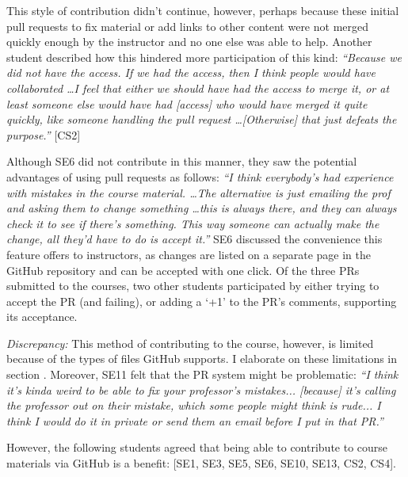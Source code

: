 This style of contribution didn't continue, however, perhaps because these initial pull requests to fix material or add links to other content were not merged quickly enough by the instructor and no one else was able to help. Another student described how this hindered more participation of this kind: \textit{``Because we did not have the access. If we had the access, then I think people would have collaborated \ldots I feel that either we should have had the access to merge it, or at least someone else would have had [access] who would have merged it quite quickly, like someone handling the pull request \ldots [Otherwise] that just defeats the purpose.''} [CS2]

Although SE6 did not contribute in this manner, they saw the potential advantages of using pull requests as follows: \textit{``I think everybody's had experience with mistakes in the course material. \ldots The alternative is just emailing the prof and asking them to change something \ldots this is always there, and they can always check it to see if there's something. This way someone can actually make the change, all they'd have to do is accept it.''} SE6 discussed the convenience this feature offers to instructors, as changes are listed on a separate page in the GitHub repository and can be accepted with one click. Of the three PRs submitted to the courses, two other students participated by either trying to accept the PR (and failing), or adding a `+1' to the PR's comments, supporting its acceptance.

\emph{Discrepancy:} This method of contributing to the course, however, is limited because of the types of files GitHub supports. I elaborate on these limitations in section . Moreover, SE11 felt that the PR system might be problematic: \textit{``I think it's kinda weird to be able to fix your professor's mistakes... [because] it's calling the professor out on their mistake, which some people might think is rude... I think I would do it in private or send them an email before I put in that PR.''}

However, the following students agreed that being able to contribute to course materials via GitHub is a benefit: [SE1, SE3, SE5, SE6, SE10, SE13, CS2, CS4]. \\ %


